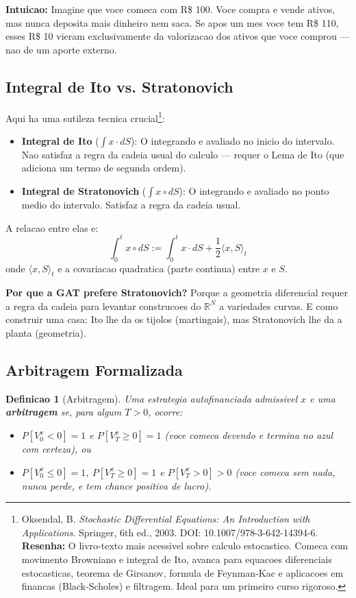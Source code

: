 \documentclass[12pt,a4paper]{article}
\newtheorem{defi}[teo]{Definicao}
\theoremstyle{remark}
\begin{document}
\textbf{Intuicao:} Imagine que voce comeca com R\$ 100. Voce compra e vende
ativos, mas nunca deposita mais dinheiro nem saca. Se apos um mes voce tem
R\$ 110, esses R\$ 10 vieram exclusivamente da valorizacao dos ativos que voce
comprou — nao de um aporte externo.

\subsection{Integral de Ito vs. Stratonovich}

Aqui ha uma sutileza tecnica crucial\footnote{Oksendal, B. \textit{Stochastic
Differential Equations: An Introduction with Applications}. Springer, 6th ed.,
2003. DOI: 10.1007/978-3-642-14394-6. \textbf{Resenha:} O livro-texto mais
acessivel sobre calculo estocastico. Comeca com movimento Browniano e integral
de Ito, avanca para equacoes diferenciais estocasticas, teorema de Girsanov,
formula de Feynman-Kac e aplicacoes em financas (Black-Scholes) e filtragem.
Ideal para um primeiro curso rigoroso.}:

\begin{itemize}
  \item \textbf{Integral de Ito} ($\int x \cdot dS$): O integrando e avaliado
        no inicio do intervalo. Nao satisfaz a regra da cadeia usual do calculo
        — requer o Lema de Ito (que adiciona um termo de segunda ordem).
  \item \textbf{Integral de Stratonovich} ($\int x \circ dS$): O integrando e
        avaliado no ponto medio do intervalo. Satisfaz a regra da cadeia usual.
\end{itemize}

A relacao entre elas e:
\[
\int_0^t x \circ dS := \int_0^t x \cdot dS + \frac{1}{2}\langle x, S\rangle_t
\]
onde $\langle x, S\rangle_t$ e a covariacao quadratica (parte continua) entre
$x$ e $S$.

\textbf{Por que a GAT prefere Stratonovich?} Porque a geometria diferencial
requer a regra da cadeia para levantar construcoes do $\mathbb{R}^N$ a variedades
curvas. E como construir uma casa: Ito lhe da os tijolos (martingais), mas
Stratonovich lhe da a planta (geometria).

\subsection{Arbitragem Formalizada}

\begin{defi}[Arbitragem]
Uma estrategia autofinanciada admissivel $x$ e uma \textbf{arbitragem} se, para
algum $T > 0$, ocorre:
\begin{itemize}[nosep]
  \item $P[V_0^x < 0] = 1$ e $P[V_T^x \geq 0] = 1$ (voce comeca devendo e
        termina no azul com certeza), ou
  \item $P[V_0^x \leq 0] = 1$, $P[V_T^x \geq 0] = 1$ e $P[V_T^x > 0] > 0$
        (voce comeca sem nada, nunca perde, e tem chance positiva de lucro).
\end{itemize}
\end{defi}
\end{document}
